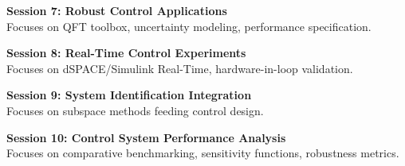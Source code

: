 \noindent\textbf{Session 7: Robust Control Applications} \\
Focuses on QFT toolbox, uncertainty modeling, performance specification.

\vspace{0.2cm}

\noindent\textbf{Session 8: Real-Time Control Experiments} \\
Focuses on dSPACE/Simulink Real-Time, hardware-in-loop validation.

\vspace{0.2cm}

\noindent\textbf{Session 9: System Identification Integration} \\
Focuses on subspace methods feeding control design.

\vspace{0.2cm}

\noindent\textbf{Session 10: Control System Performance Analysis} \\
Focuses on comparative benchmarking, sensitivity functions, robustness metrics.

\vspace{0.2cm}

\newpage
{}
